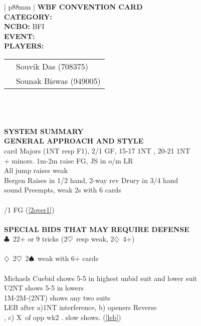 \documentclass{article}
\newcommand\C{\ensuremath{\clubsuit}}
\newcommand\D{\ensuremath{\diamondsuit}}
\renewcommand\H{\ensuremath{\heartsuit}}
\renewcommand\S{\ensuremath{\spadesuit}}
\newcommand\X{{\footnotesize X}}
\begin{document}
\begin{minipage}{90mm}
	\begin{tabular}{| p{88mm} |}
		\hline
		 \textbf{WBF CONVENTION CARD} \\ \hline
		\textbf{CATEGORY:} \\
		\textbf{NCBO:} BFI \\
		\textbf{EVENT:} \\
                \textbf{PLAYERS:} \begin{tabular}{rl} & Souvik Das (708375) \\ & Sounak Biswas (949005) \end{tabular} \\
		\multirow{2}{*}{} \\
		\\
		 \textbf{SYSTEM SUMMARY} \\ \hline
		\textbf{GENERAL APPROACH AND STYLE} \\  card Majors (1NT resp F1), 2/1 GF, 15-17 1NT , 20-21 1NT
                \\ + minors. 1m-2m raise FG, JS in o/m LR
                \\ \hline
                All jump raises weak
		\\ \hline
                Bergen Raises in 1/2 hand, 2-way rev Drury in 3/4 hand
		\\ \hline 
                sound Preempts, weak 2s with 6 cards 
		\\ \hline
		\\ /1 FG (\ref{2over1})
		\\ \hline
		\\ \hline
		\textbf{SPECIAL BIDS THAT MAY REQUIRE DEFENSE} \\  \C\ 22+ or 9 tricks (2\H\ resp weak, 2\D\ 4+)
		\\ \hline
		\\ \D\, 2\H\, 2\S\ weak with 6+ cards
		\\ \hline
		\\ \hline
                Michaels Cuebid shows 5-5 in highest unbid suit and lower suit
		\\ \hline
                U2NT shows 5-5 in lowers
		\\ \hline
                1M-2M-(2NT) shows any two suits
		\\ \hline
                LEB after a)1NT interference, b) openers Reverse
                \\ \hline, c) \X\ of opp wk2 . slow shows. (\ref{leb})

\end{tabular}
\end{minipage}
\end{document}
